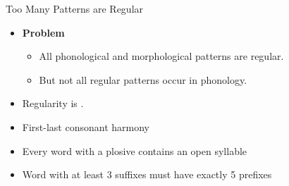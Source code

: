 \documentclass[xcolor={usenames,svgnames,x11names,table}]{beamer}
\begin{document}
\begin{frame}{Too Many Patterns are Regular}
    \begin{itemize}
        \item \textbf{Problem}
            \begin{itemize}
                \item All phonological and morphological patterns are regular.
                \item But not all regular patterns occur in phonology.
            \end{itemize}
        \item Regularity is .
    \end{itemize}
    \pause
    \begin{example}
        \begin{itemize}
            \item First-last consonant harmony
            \item Every word with a plosive contains an open syllable
            \item Word with at least 3 suffixes must have exactly 5 prefixes
        \end{itemize}
    \end{example}
\end{frame}
\end{document}
